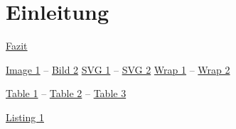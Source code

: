 \chapter{Einleitung}\label{ch:intro}
\hyperref[ch:conclusion]{Fazit}

\hyperref[fig:example-image-1]{Image 1} -- \hyperref[fig:example-image-2]{Bild 2}
\hyperref[fig:example-svg-1]{SVG 1} -- \hyperref[fig:example-svg-2]{SVG 2}
\hyperref[fig:example-wrap-1]{Wrap 1} -- \hyperref[fig:example-wrap-2]{Wrap 2}

\hyperref[tab:example-table-1]{Table 1} -- \hyperref[tab:example-table-2]{Table 2} -- \hyperref[tab:example-table-3]{Table 3}

\hyperref[lst:example-lst-1]{Listing 1}